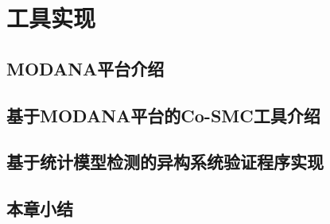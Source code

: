 \chapter{工具实现}
\label{ch5}

\section{MODANA平台介绍}

\section{基于MODANA平台的Co-SMC工具介绍}

\section{基于统计模型检测的异构系统验证程序实现}


\section{本章小结}
